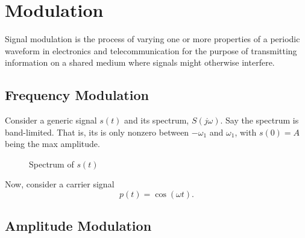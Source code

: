 \section{Modulation}
Signal modulation is the process of varying one or more properties of
a periodic waveform in electronics and telecommunication for the
purpose of transmitting information on a shared medium where signals might
otherwise interfere.
\subsection{Frequency Modulation}
Consider a generic signal $s(t)$ and its spectrum, $S(j\omega)$. Say
the spectrum is band-limited. That is, its is only nonzero between
$-\omega_1$ and $\omega_1$, with $s(0) = A$ being the max amplitude.
\begin{figure}
    \caption{Spectrum of $s(t)$}
\end{figure}

Now, consider a carrier signal
\begin{equation}
    p(t) = \cos(\omega t).
\end{equation}

\subsection{Amplitude Modulation}